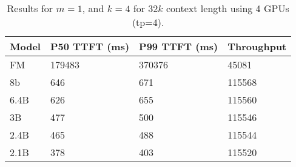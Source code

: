 \begin{table}[htbp]
\begin{tabular}{llll}
\hline \hline
Model & P50 TTFT (ms) & P99 TTFT (ms) & Throughput  \\ \hline \hline
FM    & 179483           & 370376           & 45081       \\ 
8b    & 646           & 671           & 115568      \\ 
6.4B  & 626           & 655           & 115560      \\ 
3B    & 477           & 500           & 115546      \\ 
2.4B  & 465           & 488           & 115544      \\ 
2.1B  & 378           & 403           & 115520      \\ \hline \hline
\end{tabular}
\caption{Results for $m=1$, and $k=4$ for $32k$ context length using 4 GPUs (tp=4).}
\label{table:m1k4_32k}
\end{table}